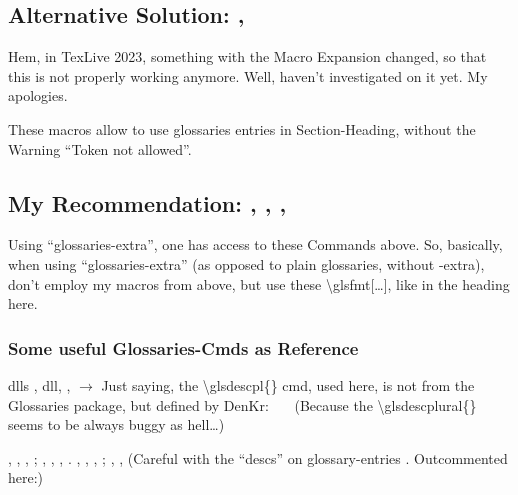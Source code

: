 \subsection{Alternative Solution: \texorpdfstring{\tokenA}{DLL}, \texorpdfstring{\tokenB}{DLL}}
Hem, in TexLive 2023, something with the Macro Expansion changed, so that this is not properly working anymore. Well, haven't investigated on it yet. My apologies.

These macros allow to use glossaries entries in Section-Heading, without the Warning \enquote{Token not allowed}.


\subsection{My Recommendation: 
, ,
, 
}

Using \enquote{glossaries-extra}, one has access to these Commands above.\nl
So, basically, when using \enquote{glossaries-extra} (as opposed to plain glossaries, without -extra), don't employ my macros from above, but use these \textbackslash glsfmt[\ldots], like in the heading here.


\subsubsection{Some useful Glossaries-Cmds as Reference}
\glspl{dll}\nl
{}, \glsdesc{dll}, ,\nl
$\rightarrow$ Just saying, the \textbackslash glsdescpl\{\} cmd, used here, is not from the Glossaries package, but defined by DenKr: %
\nl
\ \ \ (Because the \textbackslash glsdescplural\{\} seems to be always buggy as hell\ldots)

\npi
{}, , , ;\nl
{}, , , .\nl
{}, , , ;\nl
{}, , (Careful with the \enquote{descs} on glossary-entries . Outcommented here:)%

